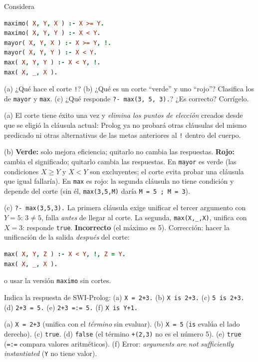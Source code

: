 \begin{prob}[\simil]
Considera
\begin{lstlisting}[language=Prolog]
maximo( X, Y, X ) :- X >= Y.
maximo( X, Y, Y ) :- X < Y.
mayor( X, Y, X ) :- X >= Y, !.
mayor( X, Y, Y ) :- X < Y.
max( X, Y, Y ) :- X < Y, !.
max( X, _, X ).
\end{lstlisting}
(a) ¿Qué hace el corte \texttt{!}? (b) ¿Qué es un corte ``verde'' y uno ``rojo''? Clasifica los de \texttt{mayor} y \texttt{max}. (c) ¿Qué responde \texttt{?- max(3, 5, 3).}? ¿Es correcto? Corrígelo.
\end{prob}
\begin{sol}
(a) El corte tiene éxito una vez y \emph{elimina los puntos de elección} creados desde que se eligió la cláusula actual: Prolog ya no probará otras cláusulas del mismo predicado ni otras alternativas de las metas anteriores al \texttt{!} dentro del cuerpo.

(b) \textbf{Verde:} solo mejora eficiencia; quitarlo no cambia las respuestas. \textbf{Rojo:} cambia el significado; quitarlo cambia las respuestas. En \texttt{mayor} es verde (las condiciones $X\ge Y$ y $X<Y$ son excluyentes; el corte evita probar una cláusula que igual fallaría). En \texttt{max} es rojo: la segunda cláusula no tiene condición y depende del corte (sin él, \texttt{max(3,5,M)} daría \texttt{M = 5 ; M = 3}).

(c) \texttt{?- max(3,5,3).} La primera cláusula exige unificar el tercer argumento con $Y=5$: $3\ne5$, falla \emph{antes} de llegar al corte. La segunda, \texttt{max(X,\_,X)}, unifica con $X=3$: responde \texttt{true}. \textbf{Incorrecto} (el máximo es 5).
Corrección: hacer la unificación de la salida \emph{después} del corte:
\begin{lstlisting}[language=Prolog]
max( X, Y, Z ) :- X < Y, !, Z = Y.
max( X, _, X ).
\end{lstlisting}
o usar la versión \texttt{maximo} sin cortes.
\end{sol}

\begin{prob}
Indica la respuesta de SWI-Prolog: (a) \texttt{X = 2+3.} (b) \texttt{X is 2+3.} (c) \texttt{5 is 2+3.} (d) \texttt{2+3 = 5.} (e) \texttt{2+3 =:= 5.} (f) \texttt{X is Y+1.}
\end{prob}
\begin{sol}
(a) \texttt{X = 2+3} (unifica con el \emph{término} sin evaluar). (b) \texttt{X = 5} (\texttt{is} evalúa el lado derecho). (c) \texttt{true}. (d) \texttt{false} (el término \texttt{+(2,3)} no es el número 5). (e) \texttt{true} (\texttt{=:=} compara valores aritméticos). (f) Error: \emph{arguments are not sufficiently instantiated} (\texttt{Y} no tiene valor).
\end{sol}

